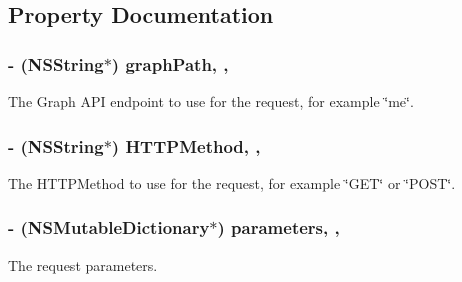 \subsection{Property Documentation}
\hypertarget{interface_f_b_s_d_k_graph_request_a10e91143d0aa1301a527f43c60c53535}{}
\subsubsection[{graph\+Path}]{\setlength{\rightskip}{0pt plus 5cm}-\/ (N\+S\+String$\ast$) graph\+Path\hspace{0.3cm}{\ttfamily [read]}, {\ttfamily [nonatomic]}, {\ttfamily [copy]}}\label{interface_f_b_s_d_k_graph_request_a10e91143d0aa1301a527f43c60c53535}
The Graph A\+P\+I endpoint to use for the request, for example \char`\"{}me\char`\"{}. \hypertarget{interface_f_b_s_d_k_graph_request_a8a290580d36baf0de7aacf859a13902c}{}
\subsubsection[{H\+T\+T\+P\+Method}]{\setlength{\rightskip}{0pt plus 5cm}-\/ (N\+S\+String$\ast$) H\+T\+T\+P\+Method\hspace{0.3cm}{\ttfamily [read]}, {\ttfamily [nonatomic]}, {\ttfamily [copy]}}\label{interface_f_b_s_d_k_graph_request_a8a290580d36baf0de7aacf859a13902c}
The H\+T\+T\+P\+Method to use for the request, for example \char`\"{}\+G\+E\+T\char`\"{} or \char`\"{}\+P\+O\+S\+T\char`\"{}. \hypertarget{interface_f_b_s_d_k_graph_request_af769aa811f0eb9f2f1e56b4ac6e323e1}{}
\subsubsection[{parameters}]{\setlength{\rightskip}{0pt plus 5cm}-\/ (N\+S\+Mutable\+Dictionary$\ast$) parameters\hspace{0.3cm}{\ttfamily [read]}, {\ttfamily [nonatomic]}, {\ttfamily [strong]}}\label{interface_f_b_s_d_k_graph_request_af769aa811f0eb9f2f1e56b4ac6e323e1}
The request parameters. \hypertarget{interface_f_b_s_d_k_graph_request_a96c19ad8e7bb79261467b812a70ef2c9}{}
